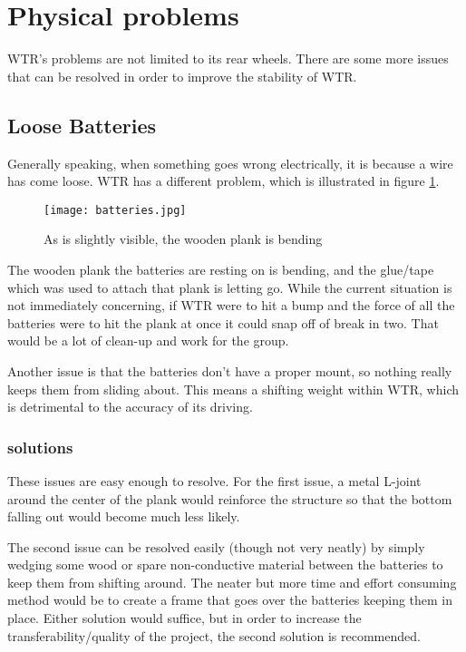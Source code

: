 \section{Physical problems}
WTR's problems are not limited to its rear wheels.
There are some more issues that can be resolved in order to improve the stability of WTR.

\subsection{Loose Batteries}
Generally speaking, when something goes wrong electrically, it is because a wire has come loose.
WTR has a different problem, which is illustrated in figure \ref{fig::batteries}.

\begin{figure}[H]
\centering
\texttt{[image: batteries.jpg]}
\caption{As is slightly visible, the wooden plank is bending}
\label{fig::batteries}
\end{figure}

The wooden plank the batteries are resting on is bending, and the glue/tape which was used to attach that plank is letting go.
While the current situation is not immediately concerning, if WTR were to hit a bump and the force of all the batteries were to hit the plank at once it could snap off of break in two.
That would be a lot of clean-up and work for the group.

Another issue is that the batteries don't have a proper mount, so nothing really keeps them from sliding about.
This means a shifting weight within WTR, which is detrimental to the accuracy of its driving.

\subsubsection{solutions}
These issues are easy enough to resolve.
For the first issue, a metal L-joint around the center of the plank would reinforce the structure so that the bottom falling out would become much less likely.

The second issue can be resolved easily (though not very neatly) by simply wedging some wood or spare non-conductive material between the batteries to keep them from shifting around.
The neater but more time and effort consuming method would be to create a frame that goes over the batteries keeping them in place.
Either solution would suffice, but in order to increase the transferability/quality of the project, the second solution is recommended.

